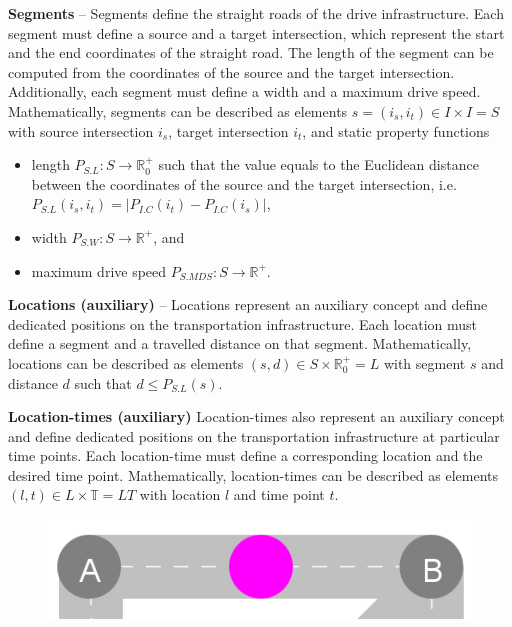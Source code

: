 \documentclass[graybox]{svmult}
\begin{document}
\noindent
\textbf{Segments}
--
Segments define the straight roads of the drive infrastructure.
Each segment must define a source and a target intersection, which represent the start and the end coordinates of the straight road.
The length of the segment can be computed from the coordinates of the source and the target intersection.
Additionally, each segment must define a width and a maximum drive speed.
Mathematically, segments can be described as elements $s = (i_s, i_t) \in I \times I = S$ with source intersection $i_s$, target intersection $i_t$, and static property functions
\begin{itemize}
	\item length $P_{S.L}: S \rightarrow \mathbb{R}_0^+$ such that the value equals to the Euclidean distance between the coordinates of the source and the target intersection, i.e.\ $P_{S.L}(i_s, i_t) = |P_{I.C}(i_t) - P_{I.C}(i_s)|$,
	\item width $P_{S.W}: S \rightarrow \mathbb{R}^+$, and
	\item maximum drive speed $P_{S.MDS}: S \rightarrow \mathbb{R}^+$.
\end{itemize}
\vspace{2mm}
\textbf{Locations (auxiliary)}
--
Locations represent an auxiliary concept and define dedicated positions on the transportation infrastructure.
Each location must define a segment and a travelled distance on that segment.
Mathematically, locations can be described as elements $(s, d) \in S \times \mathbb{R}_0^+ = L$ with segment $s$ and distance $d$ such that $d \leq P_{S.L}(s)$.

\vspace{4mm}
\noindent
\textbf{Location-times (auxiliary)}
Location-times also represent an auxiliary concept and define dedicated positions on the transportation infrastructure at particular time points.
Each location-time must define a corresponding location and the desired time point.
Mathematically, location-times can be described as elements $(l, t) \in L \times \mathbb{T} = LT$ with location $l$ and time point $t$.

\vspace{4mm}

\begin{figure}
	\centering
	\includegraphics[scale=0.25]{../../concepts/charge-station.png}
\end{figure}
\end{document}
